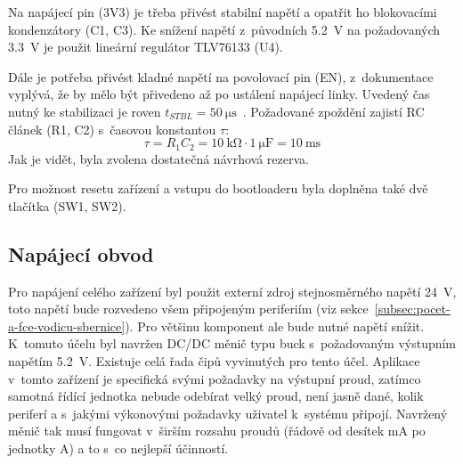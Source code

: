         Na napájecí pin (3V3) je třeba přivést stabilní napětí a opatřit ho blokovacími kondenzátory (C1, C3). Ke snížení napětí z~původních \qty{5,2}{V} na požadovaných \qty{3,3}{V} je použit lineární regulátor TLV76133 (U4). 
        
        Dále je potřeba přivést kladné napětí na povolovací pin (EN), z~dokumentace vyplývá, že by mělo být přivedeno až po ustálení napájecí linky. Uvedený čas nutný ke stabilizaci je roven \(t_{STBL}=\qty{50}{\micro\second}\)~\cite{esp32-datasheet}. Požadované zpoždění zajistí RC článek (R1, C2) s~časovou konstantou \(\tau\):
        \begin{equation}
            \tau=R_{1}C_{2}=\qty{10}{\kilo\ohm}\cdot \qty{1}{\micro\farad}=\qty{10}{\milli\second}
        \end{equation} 
        Jak je vidět, byla zvolena dostatečná návrhová rezerva. 

        Pro možnost resetu zařízení a vstupu do bootloaderu byla doplněna také dvě tlačítka (SW1, SW2).



    \subsection{Napájecí obvod}
        \label{sec:ridici-jendotka-napajeci-obvod}
        Pro napájení celého zařízení byl použit externí zdroj stejnosměrného napětí \qty{24}{V}, toto napětí bude rozvedeno všem připojeným periferiím (viz sekce~\ref{subsec:pocet-a-fce-vodicu-sbernice}). Pro většinu komponent ale bude nutné napětí snížit. K~tomuto účelu byl navržen DC/DC měnič typu buck s~požadovaným výstupním napětím \qty{5.2}{V}. Existuje celá řada čipů vyvinutých pro tento účel. Aplikace v~tomto zařízení je specifická svými požadavky na výstupní proud, zatímco samotná řídící jednotka nebude odebírat velký proud, není jasně dané, kolik periferí a s~jakými výkonovými požadavky uživatel k~systému připojí. Navržený měnič tak musí fungovat v~širším rozsahu proudů (řádově od desítek mA po jednotky A) a to s~co nejlepší účinností. 
        
